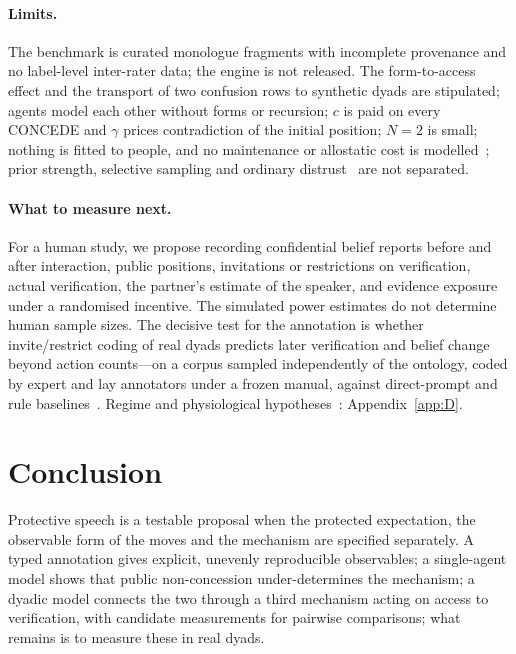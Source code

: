 \documentclass[runningheads]{llncs}
\begin{document}
\paragraph{Limits.} The benchmark is curated monologue fragments with incomplete provenance and no label-level inter-rater data; the engine is not released. The form-to-access effect and the transport of two confusion rows to synthetic dyads are stipulated; agents model each other without forms or recursion; $c$ is paid on every CONCEDE and $\gamma$ prices contradiction of the initial position; $N=2$ is small; nothing is fitted to people, and no maintenance or allostatic cost is modelled~\cite{peters2017uncertainty,seeman2001allostatic}; prior strength, selective sampling and ordinary distrust~\cite{goodman2016pragmatic,yoon2020polite} are not separated.

\paragraph{What to measure next.} For a human study, we propose recording confidential belief reports before and after interaction, public positions, invitations or restrictions on verification, actual verification, the partner's estimate of the speaker, and evidence exposure under a randomised incentive. The simulated power estimates do not determine human sample sizes. The decisive test for the annotation is whether invite/restrict coding of real dyads predicts later verification and belief change beyond action counts---on a corpus sampled independently of the ontology, coded by expert and lay annotators under a frozen manual, against direct-prompt and rule baselines~\cite{bunt2020iso,schegloff2007sequence,becker2008defensiveness}. Regime and physiological hypotheses~\cite{svet2026regimes,svet2026review}: Appendix~\ref{app:D}.

\section{Conclusion}
Protective speech is a testable proposal when the protected expectation, the observable form of the moves and the mechanism are specified separately. A typed annotation gives explicit, unevenly reproducible observables; a single-agent model shows that public non-concession under-determines the mechanism; a dyadic model connects the two through a third mechanism acting on access to verification, with candidate measurements for pairwise comparisons; what remains is to measure these in real dyads.
\end{document}
